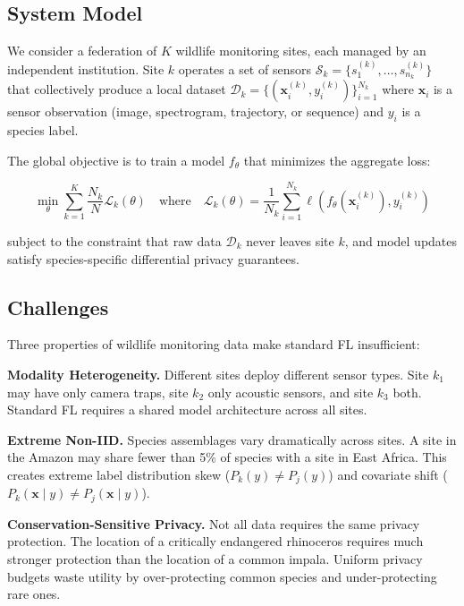 \documentclass[11pt,a4paper]{article}
\begin{document}
\subsection{System Model}

We consider a federation of $K$ wildlife monitoring sites, each managed by an independent institution.
Site $k$ operates a set of sensors $\mathcal{S}_k = \{s_1^{(k)}, \ldots, s_{n_k}^{(k)}\}$ that collectively produce a local dataset $\mathcal{D}_k = \{(\mathbf{x}_i^{(k)}, y_i^{(k)})\}_{i=1}^{N_k}$ where $\mathbf{x}_i$ is a sensor observation (image, spectrogram, trajectory, or sequence) and $y_i$ is a species label.

The global objective is to train a model $f_\theta$ that minimizes the aggregate loss:

\begin{equation}
    \min_\theta \sum_{k=1}^{K} \frac{N_k}{N} \mathcal{L}_k(\theta) \quad \text{where} \quad \mathcal{L}_k(\theta) = \frac{1}{N_k} \sum_{i=1}^{N_k} \ell(f_\theta(\mathbf{x}_i^{(k)}), y_i^{(k)})
\end{equation}

\noindent subject to the constraint that raw data $\mathcal{D}_k$ never leaves site $k$, and model updates satisfy species-specific differential privacy guarantees.

\subsection{Challenges}

Three properties of wildlife monitoring data make standard FL insufficient:

\textbf{Modality Heterogeneity.}
Different sites deploy different sensor types.
Site $k_1$ may have only camera traps, site $k_2$ only acoustic sensors, and site $k_3$ both.
Standard FL requires a shared model architecture across all sites.

\textbf{Extreme Non-IID.}
Species assemblages vary dramatically across sites.
A site in the Amazon may share fewer than 5\% of species with a site in East Africa.
This creates extreme label distribution skew ($P_k(y) \neq P_j(y)$) and covariate shift ($P_k(\mathbf{x} \mid y) \neq P_j(\mathbf{x} \mid y)$).

\textbf{Conservation-Sensitive Privacy.}
Not all data requires the same privacy protection.
The location of a critically endangered rhinoceros requires much stronger protection than the location of a common impala.
Uniform privacy budgets waste utility by over-protecting common species and under-protecting rare ones.
\end{document}
